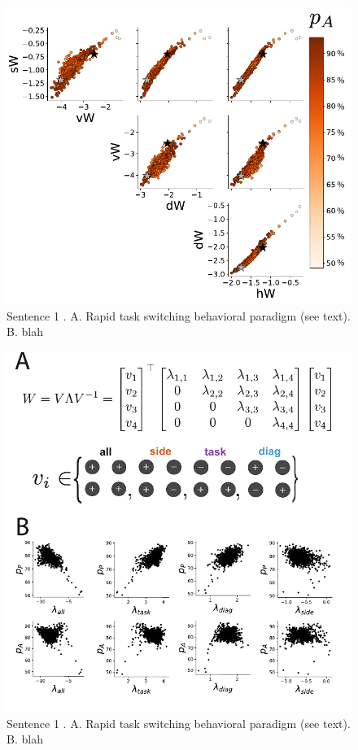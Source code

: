 \documentclass[11pt]{article}
\begin{document}
\begin{figure}
\begin{center}
\includegraphics[scale=0.75]{figs/figSX2.pdf}
\end{center}
\caption{\small Sentence 1 .
A. Rapid task switching behavioral paradigm (see text). 
B. blah}
\label{fig:SC_EPI2}
\end{figure}

\begin{figure}
\begin{center}
\includegraphics[scale=0.75]{figs/figSX1.pdf}
\end{center}
\caption{\small Sentence 1 .
A. Rapid task switching behavioral paradigm (see text). 
B. blah}
\label{fig:SC_Eigs}
\end{figure}





\end{document}
